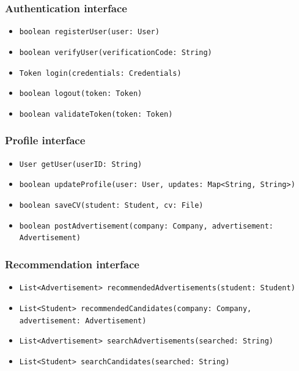 \subsubsection{Authentication interface}
\begin{itemize}
    \item \verb|boolean registerUser(user: User)|
    \item \verb|boolean verifyUser(verificationCode: String)|
    \item \verb|Token login(credentials: Credentials)|
    \item \verb|boolean logout(token: Token)|
    \item \verb|boolean validateToken(token: Token)|
\end{itemize}

\subsubsection{Profile interface}
\begin{itemize}
    \item \verb|User getUser(userID: String)|
    \item \verb|boolean updateProfile(user: User, updates: Map<String, String>)|
    \item \verb|boolean saveCV(student: Student, cv: File)|
    \item \verb|boolean postAdvertisement(company: Company, advertisement: Advertisement)|
\end{itemize}

\subsubsection{Recommendation interface}
\begin{itemize}
    \item \verb|List<Advertisement> recommendedAdvertisements(student: Student)|
    \item \verb|List<Student> recommendedCandidates(company: Company, | \\ \makebox[10em][l]{} \verb|advertisement: Advertisement)|
    \item \verb|List<Advertisement> searchAdvertisements(searched: String)|
    \item \verb|List<Student> searchCandidates(searched: String)|
\end{itemize}

